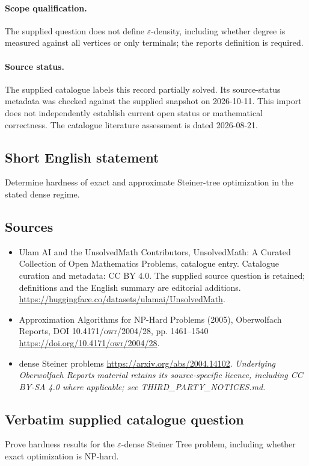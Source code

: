 \documentclass[11pt]{article}
\begin{document}
\paragraph{Scope qualification.}
The supplied question does not define $\varepsilon$-density, including whether degree is measured against all vertices or only terminals; the report\textquotesingle s definition is required.
\paragraph{Source status.}
The supplied catalogue labels this record partially solved. Its source-status metadata was checked against the supplied snapshot on 2026-10-11. This import does not independently establish current open status or mathematical correctness. The catalogue literature assessment is dated 2026-08-21.
\subsection{Short English statement}
Determine hardness of exact and approximate Steiner-tree optimization in the stated dense regime.
\subsection{Sources}
\begin{itemize}
\item[S1] Ulam AI and the UnsolvedMath Contributors, UnsolvedMath: A Curated Collection of Open Mathematics Problems, catalogue entry. Catalogue curation and metadata: CC BY 4.0. The supplied source question is retained; definitions and the English summary are editorial additions.
\url{https://huggingface.co/datasets/ulamai/UnsolvedMath}.
\item[S2] Approximation Algorithms for NP-Hard Problems (2005), Oberwolfach Reports, DOI 10.4171/owr/2004/28, pp. 1461--1540
\url{https://doi.org/10.4171/owr/2004/28}.
\item[S3] dense Steiner problems
\url{https://arxiv.org/abs/2004.14102}.
\textit{Underlying Oberwolfach Reports material retains its source-specific licence, including CC BY-SA 4.0 where applicable; see THIRD\_PARTY\_NOTICES.md.}
\end{itemize}
\subsection{Verbatim supplied catalogue question}
Prove hardness results for the $\varepsilon$-dense Steiner Tree problem, including whether exact optimization is NP-hard.
\end{document}
